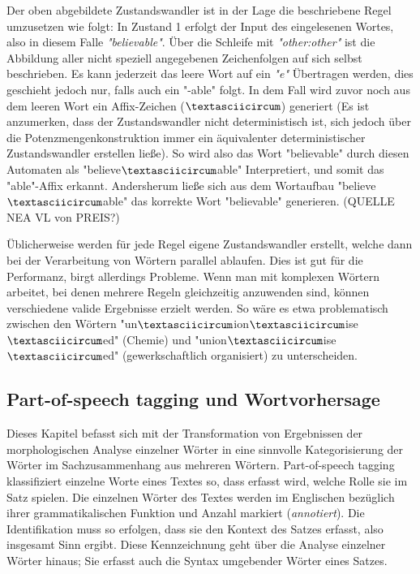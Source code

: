 \documentclass[12pt]{paper}
\begin{document}
Der oben abgebildete Zustandswandler ist in der Lage die beschriebene Regel umzusetzen wie folgt: In Zustand 1 erfolgt der Input des eingelesenen Wortes, also in diesem Falle \textit{"believable"}. Über die Schleife mit \textit{"other:other"} ist die Abbildung aller nicht speziell angegebenen Zeichenfolgen auf sich selbst beschrieben. Es kann jederzeit das leere Wort auf ein \textit{"e"} Übertragen werden, dies geschieht jedoch nur, falls auch ein "-able" folgt. In dem Fall wird zuvor noch aus dem leeren Wort ein Affix-Zeichen ($\textasciicircum$) generiert (Es ist anzumerken, dass der Zustandswandler nicht deterministisch ist, sich jedoch über die Potenzmengenkonstruktion immer ein äquivalenter deterministischer Zustandswandler erstellen ließe). So wird also das Wort "believable" durch diesen Automaten als "believe$\textasciicircum$able" Interpretiert, und somit das "able"-Affix erkannt. Andersherum ließe sich aus dem Wortaufbau "believe$\textasciicircum$able" das korrekte Wort "believable" generieren. (QUELLE NEA VL von PREIS?)

Üblicherweise werden für jede Regel eigene Zustandswandler erstellt, welche dann bei der Verarbeitung von Wörtern parallel ablaufen. Dies ist gut für die Performanz, birgt allerdings Probleme. Wenn man mit komplexen Wörtern arbeitet, bei denen mehrere Regeln gleichzeitig anzuwenden sind, können verschiedene valide Ergebnisse erzielt werden. So wäre es etwa problematisch zwischen den Wörtern "un$\textasciicircum$ion$\textasciicircum$ise$\textasciicircum$ed" (Chemie) und "union$\textasciicircum$ise$\textasciicircum$ed" (gewerkschaftlich organisiert) zu unterscheiden. 

\subsection{Part-of-speech tagging und Wortvorhersage}
Dieses Kapitel befasst sich mit der Transformation von Ergebnissen der morphologischen Analyse einzelner Wörter in eine sinnvolle Kategorisierung der Wörter im Sachzusammenhang aus mehreren Wörtern. Part-of-speech tagging klassifiziert einzelne Worte eines Textes so, dass erfasst wird, welche Rolle sie im Satz spielen. Die einzelnen Wörter des Textes werden im Englischen bezüglich ihrer grammatikalischen Funktion und Anzahl markiert (\textit{annotiert}). Die Identifikation muss so erfolgen, dass sie den Kontext des Satzes erfasst, also insgesamt Sinn ergibt. Diese Kennzeichnung geht über die Analyse einzelner Wörter hinaus; Sie erfasst auch die Syntax umgebender Wörter eines Satzes. 
\end{document}
